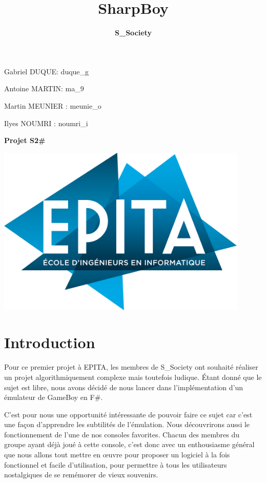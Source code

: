 \documentclass[12pt, a4paper]{article}
\title{\Huge \bf SharpBoy}
\author{\LARGE \bf S\_Society }
\begin{document}
\maketitle


\bigskip
\large Gabriel DUQUE: duque\_g

\bigskip
\large Antoine MARTIN: ma\_9

\bigskip
\large Martin MEUNIER : meunie\_o

\bigskip
\large Ilyes NOUMRI : noumri\_i

\bigskip
\large {\textbf{Projet S2\#}}

\bigskip 
\bigskip
\bigskip



\begin{center}
\includegraphics[width= 12cm]{logo-epita-hd.png} 
\end{center}


\pagebreak

\small

\tableofcontents 

\pagebreak

\large
\section{Introduction}
Pour ce premier projet à EPITA, les membres de S\_Society ont souhaité réaliser un projet algorithmiquement complexe mais toutefois ludique. Étant donné que le sujet est libre, nous avons décidé de nous lancer dans l’implémentation d’un émulateur de GameBoy en F\#.

\medskip

C’est pour nous une opportunité intéressante de pouvoir faire ce sujet car c’est une façon d’apprendre les subtilités de l’émulation. Nous découvrirons aussi le fonctionnement de l’une de nos consoles favorites. Chacun des membres du groupe ayant déjà joué à cette console, c’est donc avec un enthousiasme général que nous allons tout mettre en œuvre pour proposer un logiciel à la fois fonctionnel et facile d’utilisation, pour permettre à tous les utilisateurs nostalgiques de se remémorer de vieux souvenirs.
\end{document}
